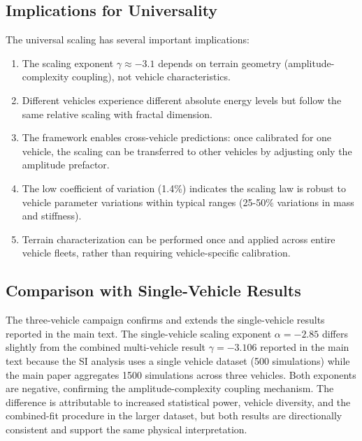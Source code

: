 \documentclass[11pt,letterpaper]{article}
\begin{document}
\subsection{Implications for Universality}

The universal scaling has several important implications:

\begin{enumerate}
\item The scaling exponent $\gamma \approx -3.1$ depends on terrain geometry (amplitude-complexity coupling), not vehicle characteristics.

\item Different vehicles experience different absolute energy levels but follow the same relative scaling with fractal dimension.

\item The framework enables cross-vehicle predictions: once calibrated for one vehicle, the scaling can be transferred to other vehicles by adjusting only the amplitude prefactor.

\item The low coefficient of variation (1.4\%) indicates the scaling law is robust to vehicle parameter variations within typical ranges (25-50\% variations in mass and stiffness).

\item Terrain characterization can be performed once and applied across entire vehicle fleets, rather than requiring vehicle-specific calibration.
\end{enumerate}

\subsection{Comparison with Single-Vehicle Results}

The three-vehicle campaign confirms and extends the single-vehicle results reported in the main text. The single-vehicle scaling exponent $\alpha = -2.85$ differs slightly from the combined multi-vehicle result $\gamma = -3.106$ reported in the main text because the SI analysis uses a single vehicle dataset (500 simulations) while the main paper aggregates 1500 simulations across three vehicles. Both exponents are negative, confirming the amplitude-complexity coupling mechanism. The difference is attributable to increased statistical power, vehicle diversity, and the combined-fit procedure in the larger dataset, but both results are directionally consistent and support the same physical interpretation.
\end{document}
